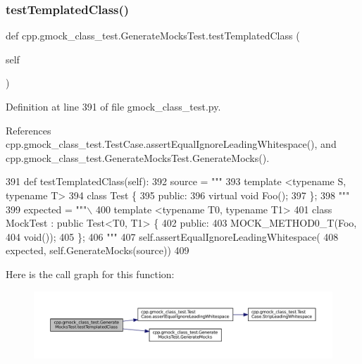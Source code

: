 \subsubsection{\texorpdfstring{test\+Templated\+Class()}{testTemplatedClass()}}
{\footnotesize\ttfamily def cpp.\+gmock\+\_\+class\+\_\+test.\+Generate\+Mocks\+Test.\+test\+Templated\+Class (\begin{DoxyParamCaption}\item[{}]{self }\end{DoxyParamCaption})}



Definition at line 391 of file gmock\+\_\+class\+\_\+test.\+py.



References cpp.\+gmock\+\_\+class\+\_\+test.\+Test\+Case.\+assert\+Equal\+Ignore\+Leading\+Whitespace(), and cpp.\+gmock\+\_\+class\+\_\+test.\+Generate\+Mocks\+Test.\+Generate\+Mocks().


\begin{DoxyCode}
391   \textcolor{keyword}{def }testTemplatedClass(self):
392     source = \textcolor{stringliteral}{"""}
393 \textcolor{stringliteral}{template <typename S, typename T>}
394 \textcolor{stringliteral}{class Test \{}
395 \textcolor{stringliteral}{ public:}
396 \textcolor{stringliteral}{  virtual void Foo();}
397 \textcolor{stringliteral}{\};}
398 \textcolor{stringliteral}{"""}
399     expected = \textcolor{stringliteral}{"""\(\backslash\)}
400 \textcolor{stringliteral}{template <typename T0, typename T1>}
401 \textcolor{stringliteral}{class MockTest : public Test<T0, T1> \{}
402 \textcolor{stringliteral}{public:}
403 \textcolor{stringliteral}{MOCK\_METHOD0\_T(Foo,}
404 \textcolor{stringliteral}{void());}
405 \textcolor{stringliteral}{\};}
406 \textcolor{stringliteral}{"""}
407     self.assertEqualIgnoreLeadingWhitespace(
408         expected, self.GenerateMocks(source))
409 
\end{DoxyCode}
Here is the call graph for this function\+:
\nopagebreak
\begin{figure}[H]
\begin{center}
\leavevmode
\includegraphics[width=350pt]{classcpp_1_1gmock__class__test_1_1GenerateMocksTest_a4098c99b66f0cbea7be9e66352a20f4d_cgraph}
\end{center}
\end{figure}
\mbox{\label{classcpp_1_1gmock__class__test_1_1GenerateMocksTest_a18cb0f03ecd4e54d0f787694c1513731}} 
